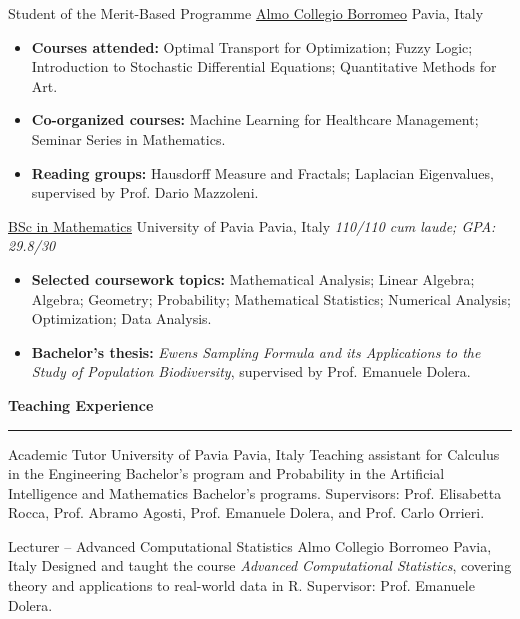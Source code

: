 \documentclass[11pt,a4paper,sans]{moderncv}
\newcommand{\cvsubsection}[1]{%
  \par
  \vspace{0.9em}%
  \noindent
  {\large\bfseries\color{cvaccent}#1}%
  \par
  \vspace{0.15em}%
  \noindent
  {\color{cvline}\rule{\textwidth}{0.4pt}}%
  \par
  \vspace{0.7em}%
}
\begin{document}
%
        {Student of the Merit-Based Programme}%
        {\href{https://www.collegioborromeo.it/}{Almo Collegio Borromeo}}%
        {Pavia, Italy}%
        {}%
        {\begin{itemize}
          \item \textbf{Courses attended:} Optimal Transport for Optimization; Fuzzy Logic; Introduction to Stochastic Differential Equations; Quantitative Methods for Art.
          \item \textbf{Co-organized courses:} Machine Learning for Healthcare Management; Seminar Series in Mathematics.
          \item \textbf{Reading groups:} Hausdorff Measure and Fractals; Laplacian Eigenvalues, supervised by Prof. Dario Mazzoleni.
        \end{itemize}}

%
        {\href{https://matematica.unipv.it/laurea-in-matematica/}{BSc in Mathematics}}%
        {University of Pavia}%
        {Pavia, Italy}%
        {\textit{110/110 \emph{cum laude}; GPA: 29.8/30}}%
        {\begin{itemize}
          \item \textbf{Selected coursework topics:} Mathematical Analysis; Linear Algebra; Algebra; Geometry; Probability; Mathematical Statistics; Numerical Analysis; Optimization; Data Analysis.
          \item \textbf{Bachelor's thesis:} \emph{Ewens Sampling Formula and its Applications to the Study of Population Biodiversity}, supervised by Prof. Emanuele Dolera.
        \end{itemize}}


\newpage
\cvsubsection{Teaching Experience}

%
        {Academic Tutor}%
        {University of Pavia}%
        {Pavia, Italy}%
        {}%
        {Teaching assistant for Calculus in the Engineering Bachelor's program and Probability in the Artificial Intelligence and Mathematics Bachelor's programs. Supervisors: Prof. Elisabetta Rocca, Prof. Abramo Agosti, Prof. Emanuele Dolera, and Prof. Carlo Orrieri.}

%
        {Lecturer -- Advanced Computational Statistics}%
        {Almo Collegio Borromeo}%
        {Pavia, Italy}%
        {}%
        {Designed and taught the course \emph{Advanced Computational Statistics}, covering theory and applications to real-world data in R. Supervisor: Prof. Emanuele Dolera.}
\end{document}
